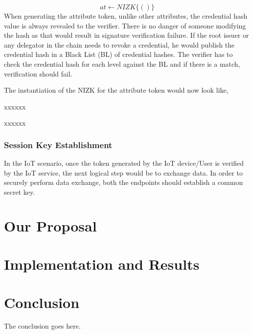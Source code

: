 \documentclass[journal]{IEEEtran}
\begin{document}
$$
at \leftarrow NIZK \lbrace(  )\rbrace
$$
When generating the attribute token, unlike other attributes, the credential hash value is always revealed to the verifier. There is no danger of someone modifying the hash as that would result in signature verification failure. If the root issuer or any delegator in the chain needs to revoke a credential, he would publish the credential hash in a Black List (BL) of credential hashes. The verifier has to check the credential hash for each level against the BL and if there is a match,  verification should fail.

The instantiation of the NIZK for the attribute token would now look like,


xxxxxx 


xxxxxx

\subsubsection{Session Key Establishment}
In the IoT scenario, once the token generated by the IoT device/User is verified by the IoT service, the next logical step would be to exchange data. In order to securely perform data exchange, both the endpoints should establish a common secret key.

\section{Our Proposal}

\section{Implementation and Results}


\section{Conclusion}
The conclusion goes here.



\end{document}
